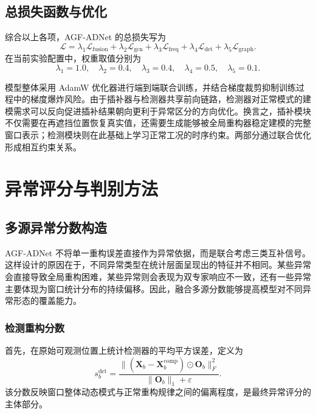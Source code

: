 \subsection{总损失函数与优化}

综合以上各项，AGF-ADNet 的总损失写为
\begin{equation}
    \mathcal{L}
    =
    \lambda_1 \mathcal{L}_{\mathrm{fusion}}
    +
    \lambda_2 \mathcal{L}_{\mathrm{gcn}}
    +
    \lambda_3 \mathcal{L}_{\mathrm{freq}}
    +
    \lambda_4 \mathcal{L}_{\mathrm{det}}
    +
    \lambda_5 \mathcal{L}_{\mathrm{graph}}.
\end{equation}
在当前实验配置中，权重取值分别为
\begin{equation}
    \lambda_1 = 1.0, \quad
    \lambda_2 = 0.4, \quad
    \lambda_3 = 0.4, \quad
    \lambda_4 = 0.5, \quad
    \lambda_5 = 0.1.
\end{equation}

模型整体采用 AdamW 优化器进行端到端联合训练，并结合梯度裁剪抑制训练过程中的梯度爆炸风险。由于插补器与检测器共享前向链路，检测器对正常模式的建模需求可以反向促进插补结果朝向更利于异常区分的方向优化。换言之，插补模块不仅需要在再遮挡位置恢复真实值，还需要生成能够被全局重构器稳定建模的完整窗口表示；检测模块则在此基础上学习正常工况的时序约束。两部分通过联合优化形成相互约束关系。

\section{异常评分与判别方法}

\subsection{多源异常分数构造}

AGF-ADNet 不将单一重构误差直接作为异常依据，而是联合考虑三类互补信号。这样设计的原因在于，不同异常类型在统计层面呈现出的特征并不相同。某些异常会直接导致全局重构困难，某些异常则会表现为双专家响应不一致，还有一些异常主要体现为窗口统计分布的持续偏移。因此，融合多源分数能够提高模型对不同异常形态的覆盖能力。

\subsubsection{检测重构分数}

首先，在原始可观测位置上统计检测器的平均平方误差，定义为
\begin{equation}
    s_b^{\mathrm{det}}
    =
    \frac{\|(\hat{\mathbf{X}}_b-\mathbf{X}_b^{\mathrm{comp}})\odot \mathbf{O}_b\|_F^2}{\|\mathbf{O}_b\|_1 + \varepsilon}.
\end{equation}
该分数反映窗口整体动态模式与正常重构规律之间的偏离程度，是最终异常评分的主体部分。

